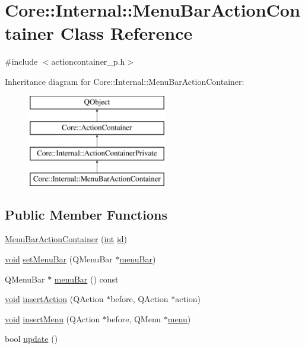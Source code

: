 \hypertarget{class_core_1_1_internal_1_1_menu_bar_action_container}{\section{Core\-:\-:Internal\-:\-:Menu\-Bar\-Action\-Container Class Reference}
\label{class_core_1_1_internal_1_1_menu_bar_action_container}
}


{\ttfamily \#include $<$actioncontainer\-\_\-p.\-h$>$}

Inheritance diagram for Core\-:\-:Internal\-:\-:Menu\-Bar\-Action\-Container\-:\begin{figure}[H]
\begin{center}
\leavevmode
\includegraphics[height=4.000000cm]{class_core_1_1_internal_1_1_menu_bar_action_container}
\end{center}
\end{figure}
\subsection*{Public Member Functions}
\begin{DoxyCompactItemize}
\item 
\hyperlink{group___core_plugin_gaaeb681e958e32ea22b8d3084b82893c1}{Menu\-Bar\-Action\-Container} (\hyperlink{ioapi_8h_a787fa3cf048117ba7123753c1e74fcd6}{int} \hyperlink{glext_8h_a58c2a664503e14ffb8f21012aabff3e9}{id})
\item 
\hyperlink{group___u_a_v_objects_plugin_ga444cf2ff3f0ecbe028adce838d373f5c}{void} \hyperlink{group___core_plugin_gad4a4ad468602effcfce96602e185f05f}{set\-Menu\-Bar} (Q\-Menu\-Bar $\ast$\hyperlink{group___core_plugin_ga0094d37ac9d9bf59377cb35eeb50bfdc}{menu\-Bar})
\item 
Q\-Menu\-Bar $\ast$ \hyperlink{group___core_plugin_ga0094d37ac9d9bf59377cb35eeb50bfdc}{menu\-Bar} () const 
\item 
\hyperlink{group___u_a_v_objects_plugin_ga444cf2ff3f0ecbe028adce838d373f5c}{void} \hyperlink{group___core_plugin_ga056bc739ab6fc888ce8e818634053af2}{insert\-Action} (Q\-Action $\ast$before, Q\-Action $\ast$action)
\item 
\hyperlink{group___u_a_v_objects_plugin_ga444cf2ff3f0ecbe028adce838d373f5c}{void} \hyperlink{group___core_plugin_ga5f4d2b69fca4e96729a1657635c8ae6b}{insert\-Menu} (Q\-Action $\ast$before, Q\-Menu $\ast$\hyperlink{group___core_plugin_ga243949a2b2abff30862e34f6313f28c0}{menu})
\item 
bool \hyperlink{group___core_plugin_gac057c6626ec37e993a4157e8712f1a46}{update} ()
\end{DoxyCompactItemize}
